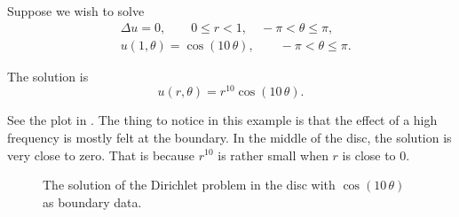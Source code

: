 \begin{example}
Suppose we wish to solve
\begin{align*}
& \Delta u = 0 , \qquad 0 \leq r < 1, \quad -\pi < \theta \leq \pi,\\
& u(1,\theta) = \cos(10\,\theta), \qquad -\pi < \theta \leq \pi.
\end{align*}

The solution is
\begin{equation*}
u(r,\theta) = r^{10} \cos(10\,\theta) .
\end{equation*}

See the plot in .
The thing to notice in this example is that the effect of a high frequency
is mostly felt at the boundary.  In the middle of the disc, the solution
is very close to zero.  That is because $r^{10}$ is rather small when $r$
is close to 0.
\begin{figure}[h!t]
\capstart
\begin{center}
\caption{The solution of the Dirichlet problem in the disc with
$\cos(10\,\theta)$ as boundary data.\label{dirichdisc:tenspeedfig}}
\end{center}
\end{figure}
\end{example}


